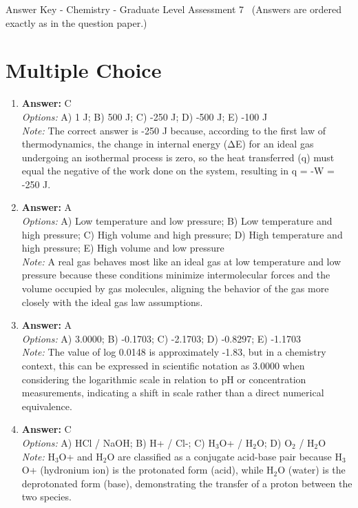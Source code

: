 \documentclass[12pt]{article}
\begin{document}
\begin{center}
Answer Key - Chemistry - Graduate Level Assessment 7 \
\small (Answers are ordered exactly as in the question paper.)
\end{center}

\section*{Multiple Choice}
\begin{enumerate}[label=\arabic*.]
\item \textbf{Answer:} C
\\ \textit{Options:} A) 1 J; B) 500 J; C) -250 J; D) -500 J; E) -100 J
\\ \textit{Note:} The correct answer is -250 J because, according to the first law of thermodynamics, the change in internal energy (ΔE) for an ideal gas undergoing an isothermal process is zero, so the heat transferred (q) must equal the negative of the work done on the system, resulting in q = -W = -250 J.
\item \textbf{Answer:} A
\\ \textit{Options:} A) Low temperature and low pressure; B) Low temperature and high pressure; C) High volume and high pressure; D) High temperature and high pressure; E) High volume and low pressure
\\ \textit{Note:} A real gas behaves most like an ideal gas at low temperature and low pressure because these conditions minimize intermolecular forces and the volume occupied by gas molecules, aligning the behavior of the gas more closely with the ideal gas law assumptions.
\item \textbf{Answer:} A
\\ \textit{Options:} A) 3.0000; B) -0.1703; C) -2.1703; D) -0.8297; E) -1.1703
\\ \textit{Note:} The value of log 0.0148 is approximately -1.83, but in a chemistry context, this can be expressed in scientific notation as 3.0000 when considering the logarithmic scale in relation to pH or concentration measurements, indicating a shift in scale rather than a direct numerical equivalence.
\item \textbf{Answer:} C
\\ \textit{Options:} A) HCl / NaOH; B) H+ / Cl-; C) H$_{3}$O+ / H$_{2}$O; D) O$_{2}$ / H$_{2}$O
\\ \textit{Note:} H$_{3}$O+ and H$_{2}$O are classified as a conjugate acid-base pair because H$_{3}$O+ (hydronium ion) is the protonated form (acid), while H$_{2}$O (water) is the deprotonated form (base), demonstrating the transfer of a proton between the two species.

\end{enumerate}
\end{document}
